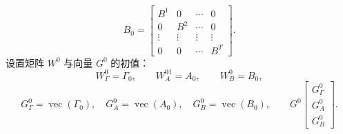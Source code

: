 \[
B_0=\begin{bmatrix}B^1&0&\cdots&0\\0&B^2&\cdots&0\\\vdots&\vdots&\vdots&\vdots\\0&0&\cdots&B^T\end{bmatrix}.
\]
设置矩阵 $W^0$ 与向量 $G^0$ 的初值：
\[
W_\Gamma^0=\Gamma_0,\qquad W_A^{01}=A_0,\qquad W_B^0=B_0,
\]
\[
G_\Gamma^0=\operatorname{vec}(\Gamma_0),\quad
G_A^0=\operatorname{vec}(A_0),\quad G_B^0=\operatorname{vec}(B_0),\qquad
G^0\begin{bmatrix}G_\Gamma^0\\G_A^0\\G_B^0\end{bmatrix}.
\]
